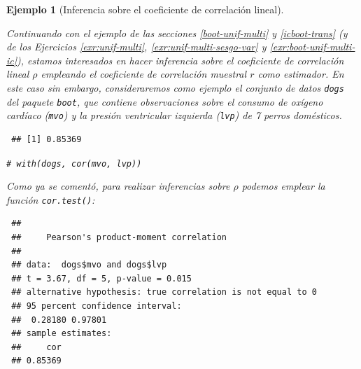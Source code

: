 \documentclass[
  10pt,
]{book}
\newenvironment{Shaded}{\begin{snugshade}}{\end{snugshade}}
\newcommand{\AttributeTok}[1]{\textcolor[rgb]{0.77,0.63,0.00}{#1}}
\newcommand{\CommentTok}[1]{\textcolor[rgb]{0.56,0.35,0.01}{\textit{#1}}}
\newcommand{\FunctionTok}[1]{\textcolor[rgb]{0.00,0.00,0.00}{#1}}
\newcommand{\NormalTok}[1]{#1}
\newcommand{\SpecialCharTok}[1]{\textcolor[rgb]{0.00,0.00,0.00}{#1}}
\newcommand{\StringTok}[1]{\textcolor[rgb]{0.31,0.60,0.02}{#1}}
\theoremstyle{break}
\newtheorem{example}{Ejemplo}[chapter]
\theoremstyle{nonumberplain}
\renewcommand{\CommentTok}[1]{\textcolor[rgb]{0.41,0.41,0.41}{\texttt{#1}}}
\begin{document}
\begin{example}[Inferencia sobre el coeficiente de correlación lineal]
\protect\hypertarget{exm:perm-test-cor}{}\label{exm:perm-test-cor}

Continuando con el ejemplo de las secciones \ref{boot-unif-multi} y \ref{icboot-trans} (y de los Ejercicios \ref{exr:unif-multi}, \ref{exr:unif-multi-sesgo-var} y \ref{exr:boot-unif-multi-ic}), estamos interesados en hacer inferencia sobre el coeficiente de correlación lineal \(\rho\) empleando el coeficiente de correlación muestral \(r\) como estimador.
En este caso sin embargo, consideraremos como ejemplo el conjunto de datos \texttt{dogs}
del paquete \texttt{boot}, que contiene observaciones sobre el consumo de
oxígeno cardíaco (\texttt{mvo}) y la presión ventricular izquierda (\texttt{lvp})
de 7 perros domésticos.

\begin{Shaded}
\end{Shaded}

\begin{verbatim}
 ## [1] 0.85369
\end{verbatim}

\begin{Shaded}
\begin{Highlighting}[]
\CommentTok{\# with(dogs, cor(mvo, lvp))}
\end{Highlighting}
\end{Shaded}

Como ya se comentó, para realizar inferencias sobre \(\rho\) podemos emplear la función \texttt{cor.test()}:

\begin{Shaded}
\end{Shaded}

\begin{verbatim}
 ## 
 ##     Pearson's product-moment correlation
 ## 
 ## data:  dogs$mvo and dogs$lvp
 ## t = 3.67, df = 5, p-value = 0.015
 ## alternative hypothesis: true correlation is not equal to 0
 ## 95 percent confidence interval:
 ##  0.28180 0.97801
 ## sample estimates:
 ##     cor 
 ## 0.85369
\end{verbatim}


\end{example}
\end{document}
